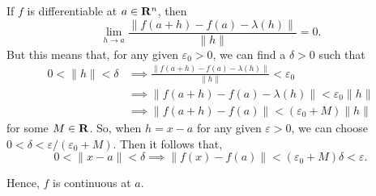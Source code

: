 \begin{solution}
    If $f$ is differentiable at $a\in \mathbf{R}^n$, then
    $$\lim_{h\to a}{\frac{\|f(a+h)-f(a)-\lambda(h)\|}
    {\|h\|}}=0.$$
    But this means that, for any given $\varepsilon_0>0$,
    we can find a $\delta>0$ such that 
    \begin{align*}
        0<\|h\|<\delta & \implies
        \frac{\|f(a+h)-f(a)-\lambda(h)\|}
        {\|h\|}<\varepsilon_0\\
        & \implies\|f(a+h)-f(a)-\lambda(h)\|
        <\varepsilon_0\|h\|\\
        & \implies\|f(a+h)-f(a)\|<(\varepsilon_0
        +M)\|h\|
    \end{align*}
    for some $M\in\mathbf{R}$. So, when $h=x-a$ for any given
    $\varepsilon>0$, we can choose $0<\delta<\varepsilon
    /(\varepsilon_0+M)$. Then it follows that,
    $$0<\|x-a\|<\delta\implies\|f(x)-f(a)\|
    <(\varepsilon_0+M)\delta<\varepsilon.$$

    Hence, $f$ is continuous at $a$.
\end{solution}